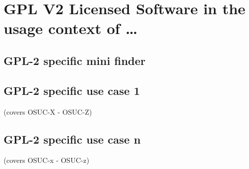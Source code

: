 %
%
%
%
%



\section{GPL V2 Licensed Software in the usage context of \ldots}
\label{OSUC-01-GPL2X} \label{OSUC-03-GPL2X} 
\label{OSUC-06-GPL2X} \label{OSUC-09-GPL2X}

\label{OSUC-02-GPL2X} \label{OSUC-04-GPL2X} \label{OSUC-05-GPL2X}
\label{OSUC-07-GPL2X} \label{OSUC-08-GPL2X} \label{OSUC-10-GPL2X}

\subsection{GPL-2 specific mini finder}

\subsection{GPL-2 specific use case 1}
(covers OSUC-X - OSUC-Z)

\subsection{GPL-2 specific use case n}
(covers OSUC-x - OSUC-z)


%
